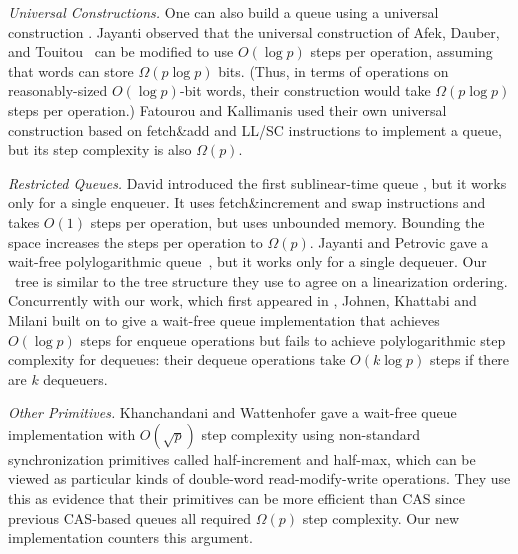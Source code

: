 
\emph{Universal Constructions.}
One can also build a queue using a universal construction \cite{10.1145/114005.102808}.
Jayanti \cite{DBLP:conf/podc/Jayanti98a} observed that
the universal construction of Afek, Dauber, and
Touitou~\cite{DBLP:conf/stoc/AfekDT95} can be modified to use $O(\log p)$ steps per operation, 
assuming that words can store $\Omega(p \log p)$ bits. 
(Thus, in terms of operations on reasonably-sized $O(\log p)$-bit words, their construction would take $\Omega(p\log p)$ steps per operation.)
Fatourou and Kallimanis \cite{FK14} used their own universal construction based on fetch\&add and LL/SC instructions
to implement a queue, but its step complexity is also $\Omega(p)$.

\emph{Restricted Queues.}
David introduced the first sublinear-time queue
\cite{DBLP:conf/wdag/David04}, but it works only for a single enqueuer.
It uses fetch\&increment and swap  instructions and takes $O(1)$ steps per operation, but
uses unbounded memory.  Bounding the space increases the steps per operation to $\Omega(p)$.
Jayanti and Petrovic gave a wait-free polylogarithmic
queue~\cite{DBLP:conf/fsttcs/JayantiP05}, but it works only for a single dequeuer. 
Our \ordering\ tree is similar to the tree structure they use to agree on a linearization ordering.
Concurrently with our work, which first appeared in \cite{Nad22}, Johnen, Khattabi and Milani \cite{JKM23} built on \cite{DBLP:conf/fsttcs/JayantiP05} to give a wait-free queue implementation 
that achieves $O(\log p)$ steps for enqueue operations but fails to achieve polylogarithmic step complexity for dequeues: their dequeue operations take $O(k \log p)$ steps if there are $k$ dequeuers.


\emph{Other Primitives.}
Khanchandani and Wattenhofer \cite{KW18} gave a wait-free queue implementation
with $O(\sqrt{p})$ step complexity using non-standard synchronization primitives
called half-increment and half-max, which can be viewed as particular kinds of
double-word read-modify-write operations.
They use this as evidence that their primitives can be more efficient than CAS
since previous CAS-based queues all required $\Omega(p)$ step complexity.
Our new implementation counters this argument.

